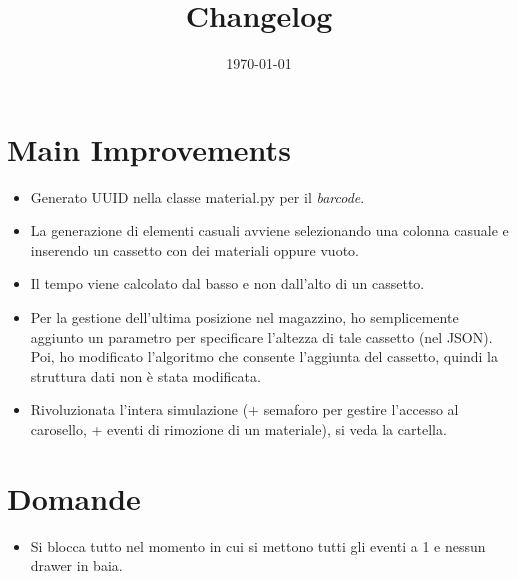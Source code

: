 \documentclass[a4paper]{article}
\begin{document}
	\title{Changelog}
	\date{\today}
	\maketitle
	
	\newpage
	
	\section*{Main Improvements}
	\begin{itemize}[label=]
		\item Generato \textsf{UUID} nella classe \textsf{material.py} per il \emph{barcode}.
		
		\item La generazione di elementi casuali avviene selezionando una colonna casuale e inserendo un cassetto con dei materiali oppure vuoto.
		
		\item Il tempo viene calcolato dal basso e non dall'alto di un cassetto.
		
		\item Per la gestione dell'ultima posizione nel magazzino, ho semplicemente aggiunto un parametro per specificare l'altezza di tale cassetto (nel \textsf{JSON}). Poi, ho modificato l'algoritmo che consente l'aggiunta del cassetto, quindi la struttura dati non è stata modificata.
		
		\item Rivoluzionata l'intera simulazione (+ semaforo per gestire l'accesso al carosello, + eventi di rimozione di un materiale), si veda la cartella.
	\end{itemize}
	
	\section*{Domande}
	\begin{itemize}
		\item Si blocca tutto nel momento in cui si mettono tutti gli eventi a 1 e nessun drawer in baia.
	\end{itemize}
\end{document}
